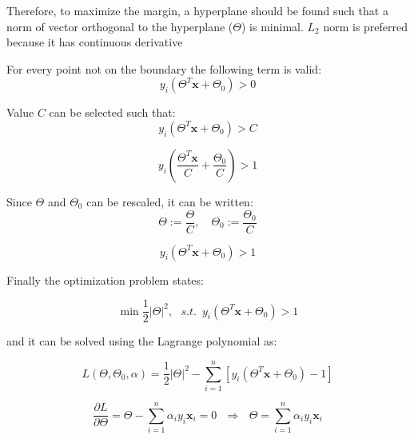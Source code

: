 \documentclass{article}
\begin{document}
Therefore, to maximize the margin, a hyperplane should be found such that a norm of vector orthogonal to the hyperplane ($\Theta$) is minimal. $L_2$ norm is preferred because it has continuous derivative 

For every point not on the boundary the following term is valid:
\begin{equation} 
y_i \left(\Theta^T \mathbf{x} + \Theta_0\right) > 0 
\end{equation}

Value $C$ can be selected such that:
\begin{equation} 
y_i \left(\Theta^T \mathbf{x} + \Theta_0\right) > C
\end{equation}

\begin{equation} 
y_i \left(\frac{\Theta^T \mathbf{x}}{C} + \frac{\Theta_0}{C}\right) > 1
\end{equation}

Since $\Theta$ and $\Theta_0$ can be rescaled, it can be written:
\begin{equation} 
\Theta := \frac{\Theta}{C}, \,\,\,\,\,\, \Theta_0 := \frac{\Theta_0}{C}
\end{equation}

\begin{equation} 
 y_i \left(\Theta^T \mathbf{x} + \Theta_0\right) > 1
\end{equation}

Finally the optimization problem states:

\begin{equation} 
\min \frac{1}{2} \vert \Theta \vert ^2, \,\,\,\, s.t. \,\,\, y_i \left(\Theta^T \mathbf{x} + \Theta_0\right) > 1
\end{equation}

and it can be solved using the Lagrange polynomial as:

\begin{equation} 
L(\Theta, \Theta_0, \alpha) = \frac{1}{2} \vert \Theta \vert ^2 - \sum_{i=1}^n \left[y_i \left(\Theta^T \mathbf{x} + \Theta_0\right) - 1\right]
\end{equation}

\begin{equation} 
\frac{\partial L}{\partial \Theta} = \Theta - \sum_{i=1}^n \alpha_i y_i \mathbf{x}_i = 0 \,\,\,\, \Rightarrow \,\,\,\, \Theta = \sum_{i=1}^n \alpha_i y_i \mathbf{x}_i
\end{equation}
\end{document}
